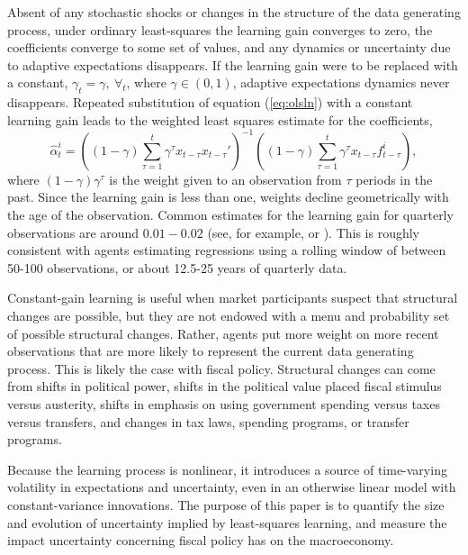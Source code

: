 \documentclass[11pt]{article}
\newcommand{\beq}{\begin{equation}}
\newcommand{\eeq}{\end{equation}}
\newcommand{\citee}[1]{\citet{#1}}
\begin{document}
Absent of any stochastic shocks or changes in the structure of the data generating process, under ordinary least-squares the learning gain converges to zero, the coefficients converge to some set of values, and any dynamics or uncertainty due to adaptive expectations disappears.  If the learning gain were to be replaced with a constant, $\gamma_t=\gamma,~ \forall_t$, where $\gamma \in (0,1)$, adaptive expectations dynamics never disappears.  Repeated substitution of equation (\ref{eq:olsln}) with a constant learning gain leads to the weighted least squares estimate for the coefficients,
\beq \hat{\alpha}^{i}_{t} = \left( (1-\gamma) \sum_{\tau=1}^{t} \gamma^\tau x_{t-\tau} x_{t-\tau}' \right)^{-1}  \left( (1-\gamma) \sum_{\tau=1}^{t} \gamma^\tau x_{t-\tau}  f^i_{t-\tau} \right), \eeq
where $(1-\gamma) \gamma^\tau$ is the weight given to an observation from $\tau$ periods in the past.  Since the learning gain is less than one, weights decline geometrically with the age of the observation.  Common estimates for the learning gain for quarterly observations are around $0.01-0.02$ (see, for example, \citee{milani2007} or \citee{slobodyan_wouters_2012}).  This is roughly consistent with agents estimating regressions using a rolling window of between 50-100 observations, or about 12.5-25 years of quarterly data.

Constant-gain learning is useful when market participants suspect that structural changes are possible, but they are not endowed with a menu and probability set of possible structural changes.  Rather, agents put more weight on more recent observations that are more likely to represent the current data generating process.  This is likely the case with fiscal policy.  Structural changes can come from shifts in political power, shifts in the political value placed fiscal stimulus versus austerity, shifts in emphasis on using government spending versus taxes versus transfers, and changes in tax laws, spending programs, or transfer programs.

Because the learning process is nonlinear, it introduces a source of time-varying volatility in expectations and uncertainty, even in an otherwise linear model with constant-variance innovations.  The purpose of this paper is to quantify the size and evolution of uncertainty implied by least-squares learning, and measure the impact uncertainty concerning fiscal policy has on the macroeconomy.  
 
\end{document}
